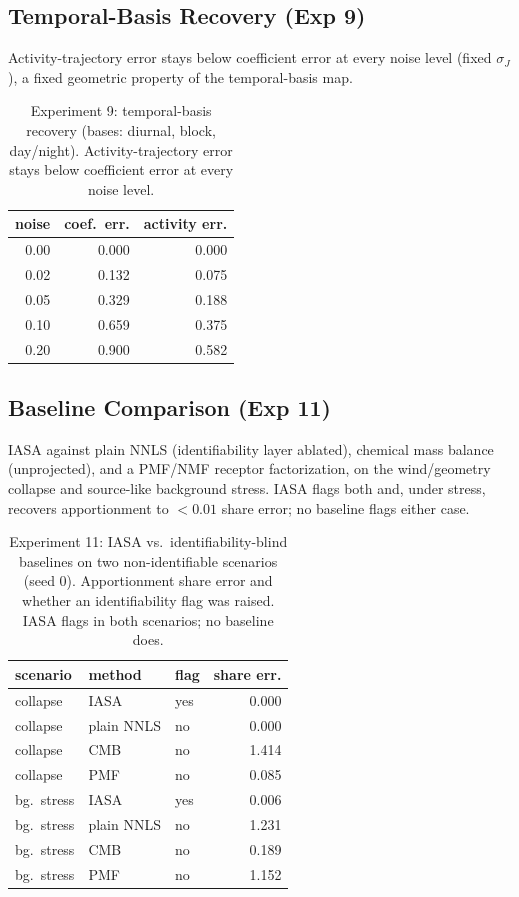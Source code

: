 \subsection{Temporal-Basis Recovery (Exp 9)}
\label{subsec:results_temporal_basis}
Activity-trajectory error stays below coefficient error at every noise level (fixed
$\sigma_J$), a fixed geometric property of the temporal-basis map.
\begin{table}[t]
\centering
\footnotesize
\caption{Experiment 9: temporal-basis recovery (bases: diurnal, block, day/night).
Activity-trajectory error stays below coefficient error at every noise level.}
\label{tab:results_temporal}
\begin{tabular}{rrr}
\toprule
noise & coef.\ err. & activity err. \\
\midrule
0.00 & 0.000 & 0.000 \\
0.02 & 0.132 & 0.075 \\
0.05 & 0.329 & 0.188 \\
0.10 & 0.659 & 0.375 \\
0.20 & 0.900 & 0.582 \\
\bottomrule
\end{tabular}
\end{table}

\subsection{Baseline Comparison (Exp 11)}
IASA against plain NNLS (identifiability layer ablated), chemical mass balance
(unprojected), and a PMF/NMF receptor factorization, on the wind/geometry collapse
and source-like background stress. IASA flags both and, under stress, recovers
apportionment to $<\!0.01$ share error; no baseline flags either case.
\begin{table}[t]
\centering
\footnotesize
\caption{Experiment 11: IASA vs.\ identifiability-blind baselines on two
non-identifiable scenarios (seed 0). Apportionment share error and whether an
identifiability flag was raised. IASA flags in both scenarios; no baseline does.}
\label{tab:results_baselines}
\begin{tabular}{lllr}
\toprule
scenario & method & flag & share err. \\
\midrule
collapse    & IASA       & yes & 0.000 \\
collapse    & plain NNLS & no  & 0.000 \\
collapse    & CMB        & no  & 1.414 \\
collapse    & PMF        & no  & 0.085 \\
\midrule
bg.\ stress & IASA       & yes & 0.006 \\
bg.\ stress & plain NNLS & no  & 1.231 \\
bg.\ stress & CMB        & no  & 0.189 \\
bg.\ stress & PMF        & no  & 1.152 \\
\bottomrule
\end{tabular}
\end{table}

